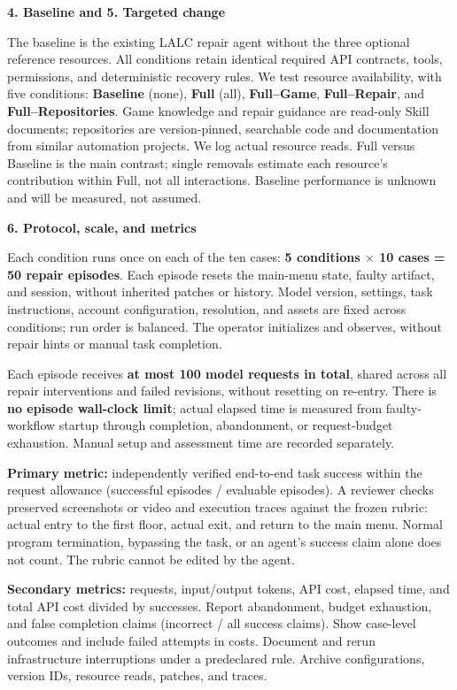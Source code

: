 \documentclass[10pt,a4paper]{article}
\newcommand{\topic}[1]{\par\medskip\textbf{#1}\par\smallskip}
\begin{document}
\topic{4. Baseline and 5. Targeted change}
The baseline is the existing LALC repair agent without the three optional
reference resources. All conditions retain identical required API contracts,
tools, permissions, and deterministic recovery rules. We test resource
availability, with five conditions: \textbf{Baseline} (none), \textbf{Full} (all),
\textbf{Full--Game}, \textbf{Full--Repair}, and \textbf{Full--Repositories}.
Game knowledge and repair guidance are read-only Skill documents; repositories
are version-pinned, searchable code and documentation from similar automation
projects. We log actual resource reads. Full versus Baseline is the main contrast;
single removals estimate each resource's contribution within Full, not all
interactions. Baseline performance is unknown and will be measured, not assumed.

\newpage
\topic{6. Protocol, scale, and metrics}
Each condition runs once on each of the ten cases:
\textbf{5 conditions $\times$ 10 cases = 50 repair episodes}.
Each episode resets the main-menu state, faulty artifact, and session, without
inherited patches or history. Model version, settings, task instructions, account
configuration, resolution, and assets are fixed across conditions; run order is
balanced. The operator initializes and observes, without repair hints or manual
task completion.

Each episode receives \textbf{at most 100 model requests in total}, shared across
all repair interventions and failed revisions, without resetting on re-entry.
There is \textbf{no episode wall-clock limit}; actual elapsed time is measured
from faulty-workflow startup through completion, abandonment, or request-budget
exhaustion. Manual setup and assessment time are recorded separately.

\textbf{Primary metric:} independently verified end-to-end task success within
the request allowance (successful episodes / evaluable episodes). A reviewer
checks preserved screenshots or video and execution traces against the frozen
rubric: actual entry to the first floor, actual exit, and return to the main menu.
Normal program termination, bypassing the task, or an agent's success claim alone
does not count. The rubric cannot be edited by the agent.

\textbf{Secondary metrics:} requests, input/output tokens, API cost, elapsed time,
and total API cost divided by successes. Report abandonment, budget exhaustion,
and false completion claims (incorrect / all success claims). Show case-level
outcomes and include failed attempts in costs. Document and rerun infrastructure
interruptions under a predeclared rule. Archive configurations, version IDs,
resource reads, patches, and traces.
\end{document}
